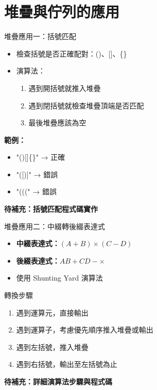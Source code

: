 \documentclass{beamer}
\begin{document}
\section{堆疊與佇列的應用}

\begin{frame}{堆疊應用一：括號匹配}
\begin{itemize}
    \item 檢查括號是否正確配對：()、[]、\{\}
    \item 演算法：
    \begin{enumerate}
        \item 遇到開括號就推入堆疊
        \item 遇到閉括號就檢查堆疊頂端是否匹配
        \item 最後堆疊應該為空
    \end{enumerate}
\end{itemize}

\vspace{1em}
\textbf{範例：}
\begin{itemize}
    \item "()[]\{\}" → 正確
    \item "([)]" → 錯誤
    \item "(((" → 錯誤
\end{itemize}

\vspace{1em}
\textbf{待補充：括號匹配程式碼實作}
\end{frame}

\begin{frame}{堆疊應用二：中綴轉後綴表達式}
\begin{itemize}
    \item \textbf{中綴表達式：}$(A + B) \times (C - D)$
    \item \textbf{後綴表達式：}$A B + C D - \times$
    \item 使用 Shunting Yard 演算法
\end{itemize}

\vspace{1em}
\begin{block}{轉換步驟}
\begin{enumerate}
    \item 遇到運算元，直接輸出
    \item 遇到運算子，考慮優先順序推入堆疊或輸出
    \item 遇到左括號，推入堆疊
    \item 遇到右括號，輸出至左括號為止
\end{enumerate}
\end{block}

\vspace{1em}
\textbf{待補充：詳細演算法步驟與程式碼}
\end{frame}
\end{document}
